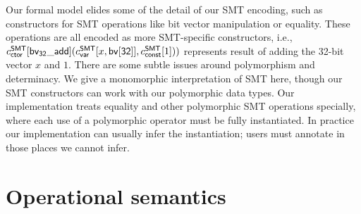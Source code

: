 \documentclass[acmsmall,screen,nonacm]{acmart}
\theoremstyle{definition}
\begin{document}
Our formal model elides some of the detail of our SMT encoding, such
as constructors for SMT operations like bit vector manipulation or
equality. These operations are all encoded as more SMT-specific
constructors, i.e.,
$c^\mathsf{SMT}_{\mathsf{ctor}}[\mathsf{bv_{32}\_add}](c^\mathsf{SMT}_{\mathsf{var}}[x,\mathsf{bv[32]}], c^\mathsf{SMT}_{\mathsf{const}}[1]))$
represents result of adding the 32-bit vector $x$ and $1$.
%
There are some subtle issues around polymorphism and determinacy. We
give a monomorphic interpretation of SMT here, though our SMT
constructors can work with our polymorphic data types. Our
implementation treats equality and other polymorphic SMT operations
specially, where each use of a polymorphic operator must be fully
instantiated. In practice our implementation can usually infer the
instantiation; users must annotate in those places we cannot infer.

\section{Operational semantics}
\label{sec:opsem}
\end{document}
